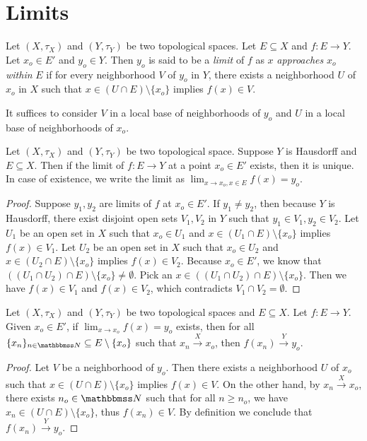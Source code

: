 \documentclass[screen,single]{techreport}
\numberwithin{equation}{section}
\begin{document}
\section{Limits}

\begin{definition}\label{De:Limits}
	Let $(X,\tau_X)$ and $(Y,\tau_Y)$ be two topological spaces.
	Let $E \subseteq X$ and $f: E \to Y$.
	Let $x_o \in E'$ and $y_o \in Y$.
	Then $y_o$ is said to be a \emph{limit} of $f$ as $x$ \emph{approaches} $x_o$ \emph{within} $E$ if for every neighborhood $V$ of $y_o$ in $Y$, there exists a neighborhood $U$ of $x_o$ in $X$ such that
	$x \in (U \cap E) \setminus \{x_o\}$ implies $f(x) \in V$.
\end{definition}

\begin{remark}\label{Rem:LimitsConsiderLocalbase}
	It suffices to consider $V$ in a local base of neighborhoods of $y_o$ and $U$ in a local base of neighborhoods of $x_o$.
\end{remark}

\begin{proposition}\label{Prop:LimitIntoT2AtMostOne}
	Let $(X,\tau_X)$ and $(Y,\tau_Y)$ be two topological space.
	Suppose $Y$ is Hausdorff and $E \subseteq X$.
	Then if the limit of $f : E \to Y$ at a point $x_o \in E'$ exists, then it is unique.
	In case of existence, we write the limit as $\lim_{x \to x_o, x \in E} f(x) = y_o$.
\end{proposition}
\begin{proof}
  Suppose $y_1,y_2$ are limits of $f$ at $x_o \in E'$.
  If $y_1 \neq y_2$, then because $Y$ is Hausdorff, there exist disjoint open sets $V_1,V_2$ in $Y$ such that $y_1 \in V_1,y_2\in V_2$.
  Let $U_1$ be an open set in $X$ such that $x_o \in U_1$ and $x \in (U_1 \cap E) \setminus \{x_o\}$ implies $f(x) \in V_1$.
  Let $U_2$ be an open set in $X$ such that $x_o \in U_2$ and $x \in (U_2 \cap E) \setminus \{x_o\}$ implies $f(x) \in V_2$.
  Because $x_o \in E'$, we know that $((U_1 \cap U_2) \cap E) \setminus \{x_o\} \neq \emptyset$.
  Pick an $x \in ((U_1 \cap U_2) \cap E) \setminus \{x_o\}$.
  Then we have $f(x) \in V_1$ and $f(x) \in V_2$, which contradicts $V_1 \cap V_2 = \emptyset$.
\end{proof}

\begin{proposition}\label{Prop:LimitImlySeqConv}
	Let $(X,\tau_X)$ and $(Y,\tau_Y)$ be two topological spaces and $E \subseteq X$.
	Let $f : E \to Y$.
	Given $x_o \in E'$, if $\lim_{x \to x_o} f(x) = y_o$ exists, then for all $\{x_n\}_{n \in \bbN} \subseteq E \setminus \{x_o\}$ such that $x_n \xrightarrow{X} x_o$, then $f(x_n) \xrightarrow{Y} y_o$.
\end{proposition}
\begin{proof}
  Let $V$ be a neighborhood of $y_o$.
  Then there exists a neighborhood $U$ of $x_o$ such that $x \in (U \cap E) \setminus \{x_o\}$ implies $f(x) \in V$.
  On the other hand, by $x_n \xrightarrow{X} x_o$, there exists $n_o \in \bbN$ such that for all $n \ge n_o$, we have $x_n \in (U \cap E) \setminus \{x_o\}$, thus $f(x_n) \in V$.
  By definition we conclude that $f(x_n) \xrightarrow{Y} y_o$.
\end{proof}
\end{document}

